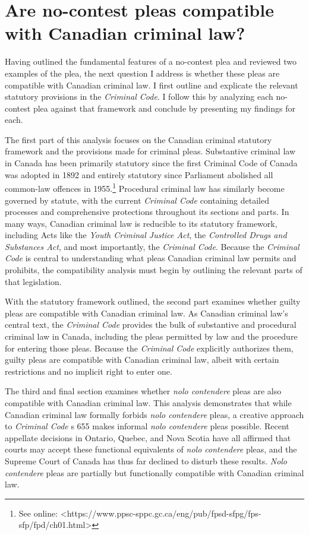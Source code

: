 \chapter{ Are no-contest pleas compatible with Canadian criminal law?}
Having outlined the fundamental features of a no-contest plea and reviewed two examples of the plea, the next question I address is whether these pleas are compatible with Canadian criminal law. I first outline and explicate the relevant statutory provisions in the \textit{Criminal Code}. I follow this by analyzing each no-contest plea against that framework and conclude by presenting my findings for each.

The first part of this analysis focuses on the Canadian criminal statutory framework and the provisions made for criminal pleas. Substantive criminal law in Canada has been primarily statutory since the first Criminal Code of Canada was adopted in 1892 and entirely statutory since Parliament abolished all common-law offences in 1955.\footnote{See online: \textless https://www.ppsc-sppc.gc.ca/eng/pub/fpsd-sfpg/fps-sfp/fpd/ch01.html\textgreater} Procedural criminal law has similarly become governed by statute, with the current \textit{Criminal Code} containing detailed processes and comprehensive protections throughout its sections and parts. In many ways, Canadian criminal law is reducible to its statutory framework, including Acts like the \textit{Youth Criminal Justice Act}, the \textit{Controlled Drugs and Substances Act}, and most importantly, the \textit{Criminal Code}. Because the \textit{Criminal Code} is central to understanding what pleas Canadian criminal law permits and prohibits, the compatibility analysis must begin by outlining the relevant parts of that legislation.

With the statutory framework outlined, the second part examines whether guilty pleas are compatible with Canadian criminal law. As Canadian criminal law's central text, the \textit{Criminal Code} provides the bulk of substantive and procedural criminal law in Canada, including the pleas permitted by law and the procedure for entering those pleas. Because the \textit{Criminal Code} explicitly authorizes them, guilty pleas are compatible with Canadian criminal law, albeit with certain restrictions and no implicit right to enter one. 

The third and final section examines whether \textit{nolo contendere} pleas are also compatible with Canadian criminal law. This analysis demonstrates that while Canadian criminal law formally forbids \textit{nolo contendere} pleas, a creative approach to \textit{Criminal Code} s 655 makes informal \textit{nolo contendere} pleas possible. Recent appellate decisions in Ontario, Quebec, and Nova Scotia have all affirmed that courts may accept these functional equivalents of \textit{nolo contendere} pleas, and the Supreme Court of Canada has thus far declined to disturb these results. \textit{Nolo contendere} pleas are partially but functionally compatible with Canadian criminal law.